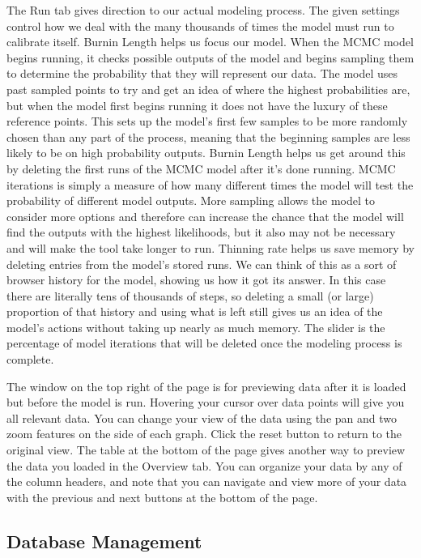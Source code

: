 \documentclass[
]{book}
\begin{document}
The Run tab gives direction to our actual modeling process. The given settings control how we deal with the many thousands of times the model must run to calibrate itself. Burnin Length helps us focus our model. When the MCMC model begins running, it checks possible outputs of the model and begins sampling them to determine the probability that they will represent our data. The model uses past sampled points to try and get an idea of where the highest probabilities are, but when the model first begins running it does not have the luxury of these reference points. This sets up the model's first few samples to be more randomly chosen than any part of the process, meaning that the beginning samples are less likely to be on high probability outputs. Burnin Length helps us get around this by deleting the first runs of the MCMC model after it's done running. MCMC iterations is simply a measure of how many different times the model will test the probability of different model outputs. More sampling allows the model to consider more options and therefore can increase the chance that the model will find the outputs with the highest likelihoods, but it also may not be necessary and will make the tool take longer to run. Thinning rate helps us save memory by deleting entries from the model's stored runs. We can think of this as a sort of browser history for the model, showing us how it got its answer. In this case there are literally tens of thousands of steps, so deleting a small (or large) proportion of that history and using what is left still gives us an idea of the model's actions without taking up nearly as much memory. The slider is the percentage of model iterations that will be deleted once the modeling process is complete.

The window on the top right of the page is for previewing data after it is loaded but before the model is run. Hovering your cursor over data points will give you all relevant data. You can change your view of the data using the pan and two zoom features on the side of each graph. Click the reset button to return to the original view. The table at the bottom of the page gives another way to preview the data you loaded in the Overview tab. You can organize your data by any of the column headers, and note that you can navigate and view more of your data with the previous and next buttons at the bottom of the page.

\hypertarget{ipm-dbmgmt}{%
\subsection{Database Management}\label{ipm-dbmgmt}}
\end{document}
